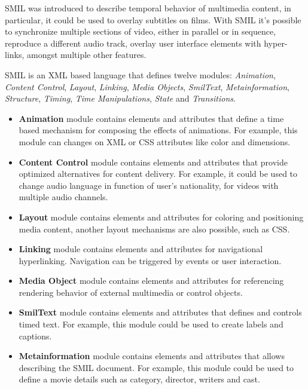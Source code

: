   \ac{SMIL}\cite{smil} was introduced to describe temporal behavior of multimedia content, in particular, it could be used to overlay subtitles on films. With \ac{SMIL} it's possible to synchronize multiple sections of video, either in parallel or in sequence, reproduce a different audio track, overlay user interface elements with hyper-links, amongst multiple other features.

  \ac{SMIL} is an \ac{XML} based language that defines twelve modules: \emph{Animation}, \emph{Content Control}, \emph{Layout}, \emph{Linking}, \emph{Media Objects}, \emph{SmilText}, \emph{Metainformation}, \emph{Structure}, \emph{Timing}, \emph{Time Manipulations}, \emph{State} and \emph{Transitions}.


\begin{itemize}

  \item \textbf{Animation} module contains elements and attributes that define a time based mechanism for composing the effects of animations. For example, this module can changes on \ac{XML} or \ac{CSS} attributes like color and dimensions.  

  \item \textbf{Content Control} module contains elements and attributes that provide optimized alternatives for content delivery. For example, it could be used to change audio language in function of user's nationality, for videos with multiple audio channels.

  \item \textbf{Layout} module contains elements and attributes for coloring and positioning media content, another layout mechanisms are also possible, such as \ac{CSS}.

  \item \textbf{Linking} module contains elements and attributes for navigational hyperlinking. Navigation can be triggered by events or user interaction.

  \item \textbf{Media Object} module contains elements and attributes for referencing rendering behavior of external multimedia or control objects.

  \item \textbf{SmilText} module contains elements and attributes that defines and controls timed text. For example, this module could be used to create labels and captions.


  \item \textbf{Metainformation} module contains elements and attributes that allows describing the \ac{SMIL} document. For example, this module could be used to define a movie details such as category, director, writers and cast.


\end{itemize}
